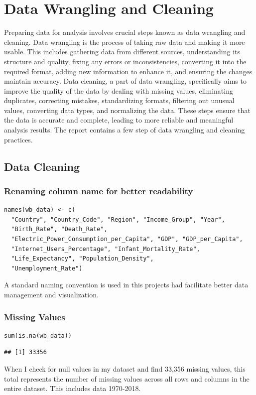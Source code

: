 \documentclass{article}\usepackage[]{graphicx}\usepackage[]{xcolor}
\makeatletter
\newenvironment{kframe}{%
 \def\at@end@of@kframe{}%
 \ifinner\ifhmode%
  \def\at@end@of@kframe{\end{minipage}}%
  \begin{minipage}{\columnwidth}%
 \fi\fi%
 \def\FrameCommand##1{\hskip\@totalleftmargin \hskip-\fboxsep
 \colorbox{shadecolor}{##1}\hskip-\fboxsep
     \hskip-\linewidth \hskip-\@totalleftmargin \hskip\columnwidth}%
 \MakeFramed {\advance\hsize-\width
   \@totalleftmargin\z@ \linewidth\hsize
   \@setminipage}}%
 {\par\unskip\endMakeFramed%
 \at@end@of@kframe}
\newenvironment{knitrout}{}{} %
\makeatother
\begin{document}
\section{Data Wrangling and Cleaning}
Preparing data for analysis involves crucial steps known as data wrangling and cleaning. Data wrangling is the process of taking raw data and making it more usable. This includes gathering data from different sources, understanding its structure and quality, fixing any errors or inconsistencies, converting it into the required format, adding new information to enhance it, and ensuring the changes maintain accuracy. Data cleaning, a part of data wrangling, specifically aims to improve the quality of the data by dealing with missing values, eliminating duplicates, correcting mistakes, standardizing formats, filtering out unusual values, converting data types, and normalizing the data. These steps ensure that the data is accurate and complete, leading to more reliable and meaningful analysis results.
The report contains a few step of data wrangling and cleaning practices.

\subsection{Data Cleaning}
\subsubsection{Renaming column name for better readability}
\begin{lstlisting}
names(wb_data) <- c(
  "Country", "Country_Code", "Region", "Income_Group", "Year", 
  "Birth_Rate", "Death_Rate", 
  "Electric_Power_Consumption_per_Capita", "GDP", "GDP_per_Capita", 
  "Internet_Users_Percentage", "Infant_Mortality_Rate", 
  "Life_Expectancy", "Population_Density", 
  "Unemployment_Rate")
\end{lstlisting}

A  standard naming convention is used in this  projects had facilitate better data management and visualization.

\newpage
\subsubsection{Missing Values}
\begin{lstlisting}
sum(is.na(wb_data))
\end{lstlisting}
\begin{knitrout}
\color{fgcolor}\begin{kframe}
\begin{verbatim}
## [1] 33356
\end{verbatim}
\end{kframe}
\end{knitrout}
When I check for null values in my dataset and find 33,356 missing values, this total represents the number of missing values across all rows and columns in the entire dataset. This includes data 1970-2018.
\end{document}

